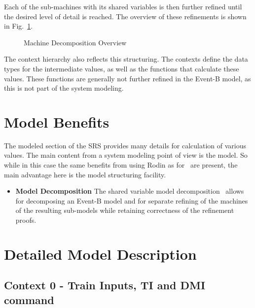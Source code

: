 \documentclass{template/openetcs_article}
\begin{document}
Each of the sub-machines with its shared variables is then further refined until
the desired level of detail is reached. The overview of these refinements is
shown in Fig.~\ref{fig:machine-decompositon-overview}.

\begin{figure}[ht]
  \centering
  \vspace{5cm}
  \caption{Machine Decomposition Overview}
  \label{fig:machine-decompositon-overview}
\end{figure}

The context hierarchy also reflects this structuring. The contexts define the
data types for the intermediate values, as well as the functions that calculate
these values. These functions are generally not further refined in the Event-B
model, as this is not part of the system modeling.

\section{Model Benefits}
\label{sec:model-highlights}

The modeled section of the SRS provides many details for calculation of various
values. The main content from a system modeling point of view is the model. So
while in this case the same benefits from using Rodin as
for~\cite{Section-3-5-Rodin,Section-4-6-Rodin} are present, the main advantage
here is the model structuring facility.

\begin{itemize}
\item {\bf Model Decomposition} The shared variable model
  decomposition~\cite{silva2011decomposition} allows for decomposing an Event-B
  model and for separate refining of the machines of the resulting
  sub-models while retaining correctness of the refinement proofs.
\end{itemize}

\section{Detailed Model Description}
\label{sec:deta-model-descr}


\subsection{Context 0 - Train Inputs, TI and DMI command}
\label{sec:context-0-entities}


\end{document}
